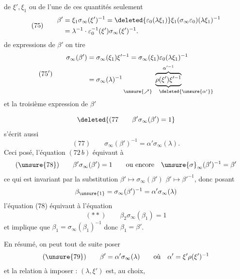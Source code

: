 de $\xi',\xi_1$ ou de l'une de ces quantités seulement
\[
(75)\qquad\begin{aligned}
\beta'&=\xi_1\sigma_\infty(\xi')^{-1}=\deleted{\varepsilon_0(\lambda\xi_1)}\xi_1(\sigma_\infty\varepsilon_0)(\lambda\xi_1)^{-1}\\
&=\lambda^{-1}\cdot\varepsilon_0^{-1}(\xi')\sigma_\infty(\xi')^{-1}.
\end{aligned}
\]
de   expressions de $\beta'$ on tire
\[
(75')\qquad\begin{aligned}
\sigma_\infty(\beta')&=\sigma_\infty(\xi_1)\xi'^{-1}=\sigma_\infty(\xi_1)\varepsilon_0(\lambda\xi_1)^{-1}\\
&=\sigma_\infty(\lambda)^{-1}\underbrace{\overbrace{\rho(\xi')\xi'^{-1}}^{\alpha'^{-1}}}_{\unsure{\nearrow}\quad\deleted{\unsure{\alpha'}}}
\end{aligned}
\]
et la troisième expression de $\beta'$ 

\[
\deleted{(77\qquad\beta'\sigma_\infty(\beta')=1}
\]
s'écrit aussi
\[
(77)\qquad\sigma_\infty(\beta')^{-1}=\alpha'\sigma_\infty(\lambda).
\]
Ceci posé, l'équation $(72\,b)$ équivaut à
\[
(\unsure{78})\qquad\beta'\sigma_\infty(\beta')=1\qquad\text{ou encore}\quad\unsure{\sigma}_\infty(\beta')^{-1}=\beta'
\]
ce qui est invariant par la substitution $\beta'\mapsto\sigma_\infty(\beta')$  $\beta'\mapsto\beta'^{-1}$, donc posant
\[
\beta_{\unsure{1}}=\sigma_\infty(\beta')^{-1}=\alpha'\sigma_\infty(\lambda)
\]
l'équation (78) équivaut à l'équation
\[
(**)\qquad\beta_2\sigma_\infty(\beta_1)=1
\]
et implique que $\beta_1=\sigma_\infty(\beta_1)^{-1}$ donc $\beta_1=\beta'$.

En résumé, on peut tout de suite poser
\[
(\unsure{79})\qquad\beta'=\alpha'\sigma_\infty(\lambda)\qquad\text{où}\quad\alpha'=\xi'\rho(\xi')^{-1}
\]
et la relation à imposer : $(\lambda,\xi')$ est, au choix,
